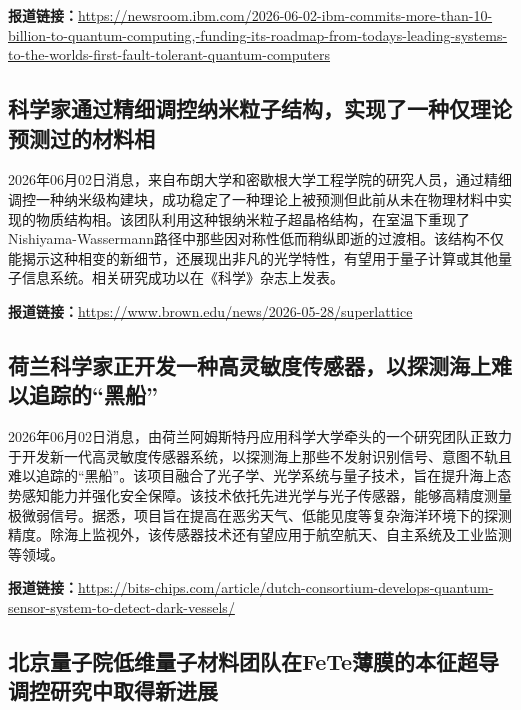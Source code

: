 \documentclass[12pt,a4paper]{ctexart}
\begin{document}
\noindent\textbf{报道链接：}\url{https://newsroom.ibm.com/2026-06-02-ibm-commits-more-than-10-billion-to-quantum-computing,-funding-its-roadmap-from-todays-leading-systems-to-the-worlds-first-fault-tolerant-quantum-computers}

\subsection{ 科学家通过精细调控纳米粒子结构，实现了一种仅理论预测过的材料相 }

2026年06月02日消息，来自布朗大学和密歇根大学工程学院的研究人员，通过精细调控一种纳米级构建块，成功稳定了一种理论上被预测但此前从未在物理材料中实现的物质结构相。该团队利用这种银纳米粒子超晶格结构，在室温下重现了Nishiyama-Wassermann路径中那些因对称性低而稍纵即逝的过渡相。该结构不仅能揭示这种相变的新细节，还展现出非凡的光学特性，有望用于量子计算或其他量子信息系统。相关研究成功以在《科学》杂志上发表。

\noindent\textbf{报道链接：}\url{https://www.brown.edu/news/2026-05-28/superlattice}

\subsection{ 荷兰科学家正开发一种高灵敏度传感器，以探测海上难以追踪的“黑船” }

2026年06月02日消息，由荷兰阿姆斯特丹应用科学大学牵头的一个研究团队正致力于开发新一代高灵敏度传感器系统，以探测海上那些不发射识别信号、意图不轨且难以追踪的“黑船”。该项目融合了光子学、光学系统与量子技术，旨在提升海上态势感知能力并强化安全保障。该技术依托先进光学与光子传感器，能够高精度测量极微弱信号。据悉，项目旨在提高在恶劣天气、低能见度等复杂海洋环境下的探测精度。除海上监视外，该传感器技术还有望应用于航空航天、自主系统及工业监测等领域。

\noindent\textbf{报道链接：}\url{https://bits-chips.com/article/dutch-consortium-develops-quantum-sensor-system-to-detect-dark-vessels/}

\subsection{ 北京量子院低维量子材料团队在FeTe薄膜的本征超导调控研究中取得新进展 }
\end{document}
